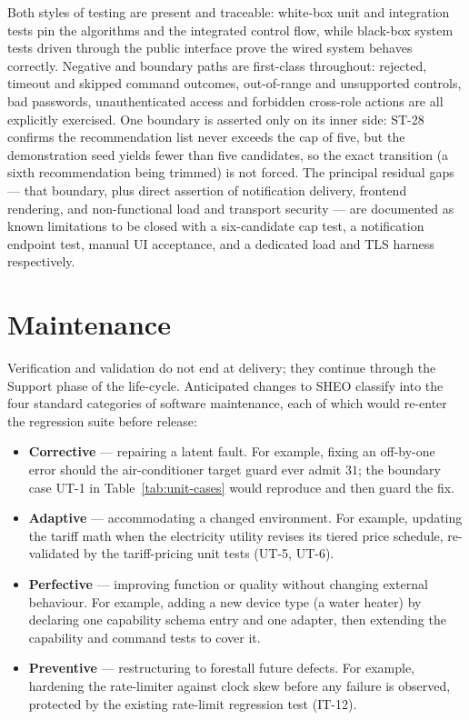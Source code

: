 Both styles of testing are present and traceable: white-box unit and integration
tests pin the algorithms and the integrated control flow, while black-box system
tests driven through the public interface prove the wired system behaves
correctly. Negative and boundary paths are first-class throughout: rejected,
timeout and skipped command outcomes, out-of-range and unsupported controls, bad
passwords, unauthenticated access and forbidden cross-role actions are all
explicitly exercised. One boundary is asserted only on its inner side: ST-28
confirms the recommendation list never exceeds the cap of five, but the
demonstration seed yields fewer than five candidates, so the exact transition (a
sixth recommendation being trimmed) is not forced. The principal residual gaps ---
that boundary, plus direct assertion of notification delivery, frontend rendering,
and non-functional load and transport security --- are documented as known
limitations to be closed with a six-candidate cap test, a notification endpoint
test, manual UI acceptance, and a dedicated load and TLS harness respectively.

\section{Maintenance}
\label{sec:qa-maintenance}

Verification and validation do not end at delivery; they continue through the
Support phase of the life-cycle. Anticipated changes to SHEO classify into the
four standard categories of software maintenance, each of which would re-enter the
regression suite before release:

\begin{itemize}[leftmargin=1.4em]
  \item \textbf{Corrective} --- repairing a latent fault. For example, fixing an
        off-by-one error should the air-conditioner target guard ever admit $31$;
        the boundary case UT-1 in Table~\ref{tab:unit-cases} would reproduce and
        then guard the fix.
  \item \textbf{Adaptive} --- accommodating a changed environment. For example,
        updating the tariff math when the electricity utility revises its tiered
        price schedule, re-validated by the tariff-pricing unit tests (UT-5, UT-6).
  \item \textbf{Perfective} --- improving function or quality without changing
        external behaviour. For example, adding a new device type (a water
        heater) by declaring one capability schema entry and one adapter, then
        extending the capability and command tests to cover it.
  \item \textbf{Preventive} --- restructuring to forestall future defects. For
        example, hardening the rate-limiter against clock skew before any failure
        is observed, protected by the existing rate-limit regression test (IT-12).
\end{itemize}


